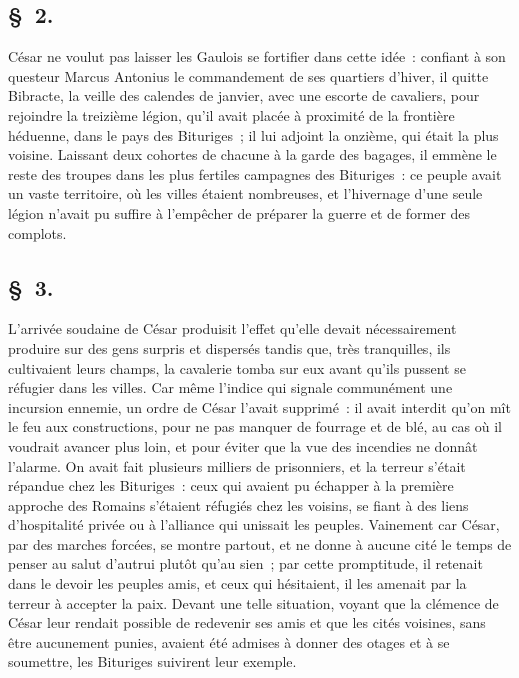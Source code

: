 \documentclass[french,twoside]{book} %
\begin{document}
\subsection[{§ 2.}]{ \textsc{§ 2.} }
\noindent César ne voulut pas laisser les Gaulois se fortifier dans cette idée : confiant à son questeur Marcus Antonius le commandement de ses quartiers d’hiver, il quitte Bibracte, la veille des calendes de janvier, avec une escorte de cavaliers, pour rejoindre la treizième légion, qu’il avait placée à proximité de la frontière héduenne, dans le pays des Bituriges ; il lui adjoint la onzième, qui était la plus voisine. Laissant deux cohortes de chacune à la garde des bagages, il emmène le reste des troupes dans les plus fertiles campagnes des Bituriges : ce peuple avait un vaste territoire, où les villes étaient nombreuses, et l’hivernage d’une seule légion n’avait pu suffire à l’empêcher de préparer la guerre et de former des complots.
\subsection[{§ 3.}]{ \textsc{§ 3.} }
\noindent L'arrivée soudaine de César produisit l’effet qu’elle devait nécessairement produire sur des gens surpris et dispersés tandis que, très tranquilles, ils cultivaient leurs champs, la cavalerie tomba sur eux avant qu’ils pussent se réfugier dans les villes. Car même l’indice qui signale communément une incursion ennemie, un ordre de César l’avait supprimé : il avait interdit qu’on mît le feu aux constructions, pour ne pas manquer de fourrage et de blé, au cas où il voudrait avancer plus loin, et pour éviter que la vue des incendies ne donnât l’alarme. On avait fait plusieurs milliers de prisonniers, et la terreur s’était répandue chez les Bituriges : ceux qui avaient pu échapper à la première approche des Romains s’étaient réfugiés chez les voisins, se fiant à des liens d’hospitalité privée ou à l’alliance qui unissait les peuples. Vainement car César, par des marches forcées, se montre partout, et ne donne à aucune cité le temps de penser au salut d’autrui plutôt qu’au sien ; par cette promptitude, il retenait dans le devoir les peuples amis, et ceux qui hésitaient, il les amenait par la terreur à accepter la paix. Devant une telle situation, voyant que la clémence de César leur rendait possible de redevenir ses amis et que les cités voisines, sans être aucunement punies, avaient été admises à donner des otages et à se soumettre, les Bituriges suivirent leur exemple.
\end{document}
